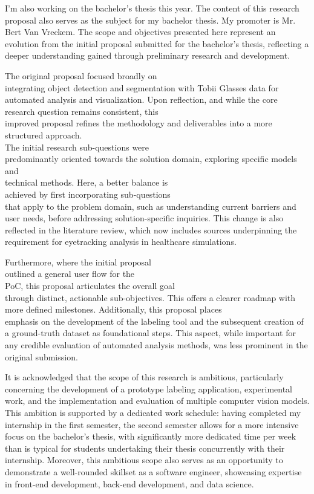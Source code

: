 \documentclass[english]{hogent-article}
\begin{document}
I'm also working on the bachelor's thesis this year. The content of this research proposal also serves as the subject for my bachelor thesis. 
My promoter is Mr. Bert Van Vreckem. The scope and objectives presented here represent an evolution from the initial proposal submitted 
for the bachelor's thesis, reflecting a deeper understanding gained through preliminary research and development.

The original proposal focused broadly on\\ integrating object detection and segmentation with Tobii Glasses data for automated analysis and visualization.
Upon reflection, and while the core research question remains consistent, this\\ improved proposal refines the 
methodology and deliverables into a more structured approach.\\
The initial research sub-questions were\\ predominantly oriented towards the solution domain, exploring specific models and\\ technical methods.
Here, a better balance is\\ achieved by first incorporating sub-questions\\ that apply to the problem domain, such as understanding current barriers and user needs, before addressing solution-specific inquiries.
This change is also reflected in the literature review, which now includes sources underpinning the requirement for eyetracking analysis in healthcare simulations.

Furthermore, where the initial proposal\\ outlined a general user flow for the\\ PoC,
this proposal articulates the overall goal\\ through distinct, actionable sub-objectives.
This offers a clearer roadmap with more defined milestones.
Additionally, this proposal places\\ emphasis on the development of the labeling tool and the subsequent creation of a ground-truth dataset as foundational steps.
This aspect, while important for any credible evaluation of automated analysis methods, was less prominent in the original submission.

It is acknowledged that the scope of this research is ambitious, particularly concerning the development of a 
prototype labeling application, experimental work, and the implementation and evaluation of multiple computer vision models.
This ambition is supported by a dedicated work schedule: having completed my internship in the first semester, the second semester allows for a more intensive focus
on the bachelor's thesis, with significantly more dedicated time per week than is typical for students undertaking their thesis concurrently with their internship.
Moreover, this ambitious scope also serves as an opportunity to demonstrate a well-rounded skillset as a software engineer, showcasing expertise in front-end development, back-end development, and data science.
\end{document}
